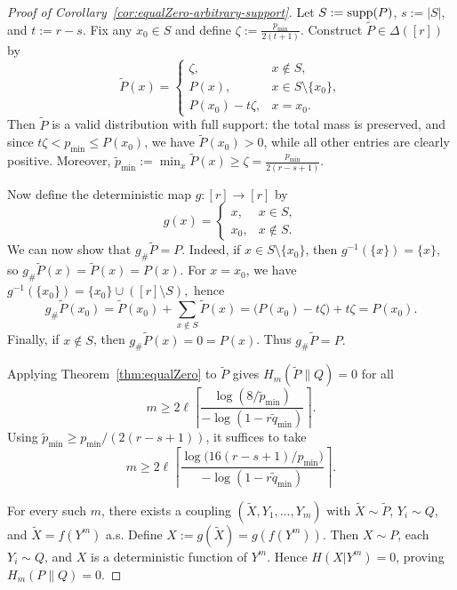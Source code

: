 \documentclass[journal]{IEEEtran}
\def\supp{\mathop{\rm supp}}
\newcommand{\1}{\mathbf{1}}
\begin{document}
\begin{proof}[Proof of Corollary~\ref{cor:equalZero-arbitrary-support}]
Let \(S:=\supp(P)\), \(s:=|S|\), and \(t:=r-s\). Fix any \(x_0\in S\) and define
\(\zeta:=\frac{p_{\min}}{2(t+1)}\). Construct \(\widetilde P\in\Delta([r])\) by
\[
\widetilde P(x)=
\begin{cases}
\zeta, & x\notin S,\\
P(x), & x\in S\setminus\{x_0\},\\
P(x_0)-t\zeta, & x=x_0.
\end{cases}
\]
Then \(\widetilde P\) is a valid distribution with full support: the total mass is preserved, and since \(t\zeta< p_{\min}\le P(x_0)\), we have \(\widetilde P(x_0)>0\), while all other entries are clearly positive. Moreover, \(\widetilde p_{\min}:=\min_x \widetilde P(x)\ge \zeta=\frac{p_{\min}}{2(r-s+1)}\).

Now define the deterministic map \(g:[r]\to[r]\) by
\[g(x)=\begin{cases}
x, & x\in S,\\
x_0, & x\notin S.
\end{cases}\]
We can now show that \(g_{\#}\widetilde P=P\). Indeed, if \(x\in S\setminus\{x_0\}\), then \(g^{-1}(\{x\})=\{x\}\), so
\(g_{\#}\widetilde P(x)=\widetilde P(x)=P(x).\)
For \(x=x_0\), we have \(g^{-1}(\{x_0\})=\{x_0\}\cup([r]\setminus S),\)
hence
\[g_{\#}\widetilde P(x_0)=\widetilde P(x_0)+\sum_{x\notin S}\widetilde P(x)=\bigl(P(x_0)-t\zeta\bigr)+t\zeta
=P(x_0).\]
Finally, if \(x\notin S\), then \(g_{\#}\widetilde P(x)=0=P(x)\). Thus $g_{\#}\widetilde P=P.$

Applying Theorem~\ref{thm:equalZero} to $\widetilde P$ gives \(H_m(\widetilde P\|Q)=0\) for all
\[
m \ge 2\ell\left\lceil \frac{\log(8/\widetilde p_{\min})}{-\log(1-r\widetilde q_{\min})} \right\rceil.
\]
Using \(\widetilde p_{\min}\ge p_{\min}/(2(r-s+1))\), it suffices to take
\[
m \ge 2\ell\left\lceil \frac{\log\bigl(16(r-s+1)/p_{\min}\bigr)}{-\log(1-r\widetilde q_{\min})} \right\rceil.
\]

For every such \(m\), there exists a coupling \((\widetilde X,Y_1,\dots,Y_m)\) with \(\widetilde X\sim \widetilde P\), \(Y_i\sim Q\), and \(\widetilde X=f(Y^m)\) a.s. Define \(X:=g(\widetilde X)=g(f(Y^m))\). Then \(X\sim P\), each \(Y_i\sim Q\), and \(X\) is a deterministic function of \(Y^m\). Hence \(H(X| Y^m)=0\), proving \(H_m(P\|Q)=0\).
\end{proof}

\end{document}
